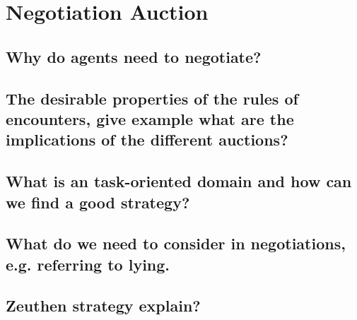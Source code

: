 \section{Negotiation Auction}
\subsection{Why do agents need to negotiate?}
\subsection{The desirable properties of the rules of encounters, give example what are the implications of the different auctions?}
\subsection{What is an task-oriented domain and how can we find a good strategy?}
\subsection{What do we need to consider in negotiations, e.g. referring to lying.}
\subsection{Zeuthen strategy explain?}
